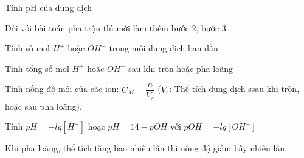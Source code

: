 \documentclass[Main.tex]{subfiles}
\begin{document}
\begin{dang}{Tính pH của dung dịch}
\end{dang}
\begin{pp}
Đối với bài toán pha trộn thì mới làm thêm bước 2, bước 3
\begin{cacbuoc}
	\item Tính số mol $H^+$ hoặc $OH^-$ trong mỗi dung dịch ban đầu
	\item Tính tổng số mol $H^+$ hoặc $OH^-$ sau khi trộn hoặc pha loãng
	\item Tính nồng độ mới của các ion: $C_M=\dfrac{n}{V_s}$ ($V_s$: Thể tích dung dịch ssau khi trộn, hoặc sau pha loãng).
	\item Tính $pH=-lg[H^+]$ hoặc $pH=14-pOH$ với $pOH =-lg[OH^-]$
\end{cacbuoc}
\end{pp}
{ Khi pha loãng, thể tích tăng bao nhiêu lần thì nồng độ giảm bấy nhiêu lần.}
\begin{center}
\end{center}
\end{document}
